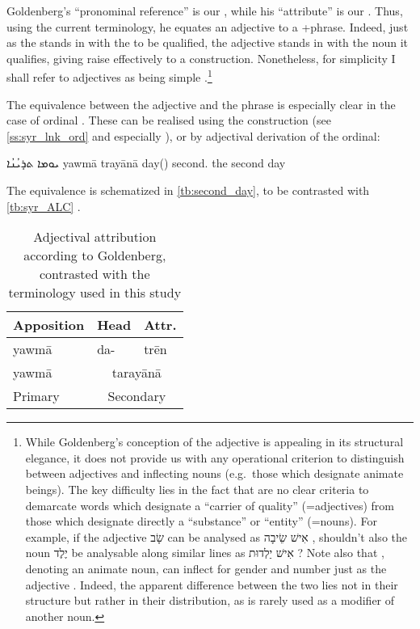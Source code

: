 {{{{Goldenberg's \enquote{pronominal reference} is our , while his \enquote{attribute} is our \secn. Thus, using the current terminology, he equates an adjective to a \lnk+\secn phrase. Indeed, just as the \lnk* stands in  with the \prim to be qualified, the adjective stands in  with the noun it qualifies, giving raise effectively to a  construction. Nonetheless, for simplicity I shall refer to adjectives as being simple \secns.\footnote{While Goldenberg's conception of the adjective is appealing in its structural elegance, it does not provide us with any operational criterion to distinguish between adjectives and inflecting nouns (e.g.\ those which designate animate beings). The key difficulty lies in the fact that are no clear criteria to demarcate  words which designate a \enquote{carrier of quality} (=adjectives) from those which designate directly a \enquote{substance} or \enquote{entity} (=nouns). For example, if the  adjective \texthebrew{שָׂב}  can be analysed as  \texthebrew{אִישׁ שֵׂיבָה}  \citep[9]{GoldenbergAttribution}, shouldn't also the noun \texthebrew{יֶלֶד}  be analysable along similar lines as \texthebrew{אִישׁ יַלְדוּת} ? Note also that , denoting an animate noun, can inflect for gender and number just as the adjective . Indeed, the apparent difference between the two lies not in their structure but rather in their distribution, as  is rarely used as a modifier of another noun.} 

The equivalence between the adjective and the \lnk* phrase is especially clear in the case of ordinal \secns. These can be realised using the \lnk* construction (see \ref{ss:syr_lnk_ord} and especially ), or by adjectival derivation of the ordinal:

{ܝܘܡܐ ܬܪܱܝܳܢܳܐ}
{yawmā trayānā}
{day(\masc) second.\masc}
{the second day}
{\cite[178, \S 239]{NoldekeSyriac}}

The equivalence is schematized in \vref{tb:second_day}, to be contrasted with \vref{tb:syr_ALC} \citep[cf.][236]{GoldenbergSemitic}.

\begin{table}[h!]
\centering
\begin{tabular}{l l l}
\toprule
Apposition & Head & Attr. \\
\midrule
yawmā & da- & trēn \\
yawmā & \multicolumn{2}{c}{tarayānā} \\
\midrule 
Primary & \multicolumn{2}{c}{Secondary} \\
\bottomrule
\end{tabular}
\caption[Adjectival attribution according to Goldenberg]{Adjectival attribution according to Goldenberg, contrasted with the terminology used in this study} \label{tb:second_day}
\end{table}


}}}}
